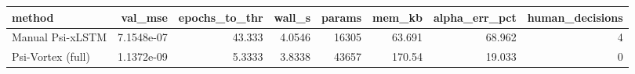 \begin{tabular}{lrrrrrrr}
\toprule
method & val_mse & epochs_to_thr & wall_s & params & mem_kb & alpha_err_pct & human_decisions \\
\midrule
Manual Psi-xLSTM & 7.1548e-07 & 43.333 & 4.0546 & 16305 & 63.691 & 68.962 & 4 \\
Psi-Vortex (full) & 1.1372e-09 & 5.3333 & 3.8338 & 43657 & 170.54 & 19.033 & 0 \\
\bottomrule
\end{tabular}
